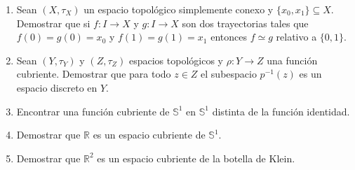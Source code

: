 \documentclass[12pt]{report}
\numberwithin{section}{chapter}
\newcommand{\R}{\mathbb R}
\newcommand{\s}{\mathbb S}
\begin{document}
\begin{enumerate}
\item Sean $(X, \tau_X)$ un espacio topológico simplemente conexo y $\{x_0,x_1\} \subseteq X$. Demostrar que si $f: I \to X$ y $g: I \to X$ son dos trayectorias tales que  $f(0)=g(0)=x_0$ y $f(1)=g(1)=x_1$ entonces $f\simeq g$ relativo a $\{0,1\}$.

\item Sean $(Y,\tau_Y)$ y $(Z, \tau_Z)$ espacios topológicos y $\rho: Y \to Z$ una función cubriente. Demostrar que para todo $z\in Z$ el subespacio $p^{-1}(z)$ es un espacio discreto en $Y$.

\item Encontrar una función cubriente de $\s^1$ en $\s^1$ distinta de la función identidad.

\item Demostrar que $\R$ es un espacio cubriente de $\s^1$.

\item Demostrar que $\R^2$ es un espacio cubriente de la botella de Klein.

\end{enumerate}
\end{document}
